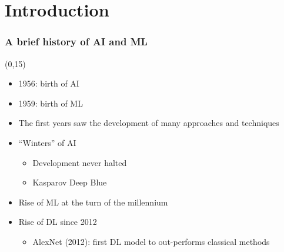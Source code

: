 \section{Introduction}

\begin{frame}
  \frametitle{A brief history of \acs{AI} and \acs{ML}}

  \begin{textblock}{45}(0,15)
    \begin{itemize}
    \item<1-> 1956: birth of \acl{AI}
    \item<3-> 1959: birth of \acl{ML}
    \item<4-> The first years saw the development of many approaches and techniques
    \item<5-> ``Winters'' of \ac{AI}
      \begin{itemize}
      \item Development never halted
      \item Kasparov \vs{} Deep Blue
      \end{itemize}
    \item<6-> Rise of \ac{ML} at the turn of the millennium
    \item<7-> Rise of \acl{DL} since 2012
      \begin{itemize}
      \item AlexNet (2012): first \ac{DL} model to out-performs classical methods
      \end{itemize}
    \end{itemize}
  \end{textblock}


\end{frame}
